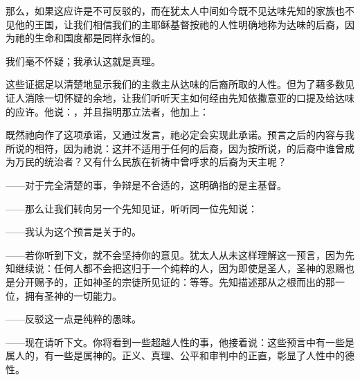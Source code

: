 那么，如果这应许是不可反驳的，而在犹太人中间如今既不见达味先知的家族也不见他的王国，让我们相信我们的主耶稣基督按祂的人性明确地称为达味的后裔，因为祂的生命和国度都是同样永恒的。\par

我们毫不怀疑；我承认这就是真理。\par

这些证据足以清楚地显示我们的主救主从达味的后裔所取的人性。但为了藉多数见证人消除一切怀疑的余地，让我们听听天主如何经由先知依撒意亚的口提及给达味的应许。他说：，并且指明那立法者，他加上：\par

既然祂向作了这项承诺，又通过发言，祂必定会实现此承诺。预言之后的内容与我所说的相符，因为祂说：这并不适用于任何的后裔，因为按所说，的后裔中谁曾成为万民的统治者？又有什么民族在祈祷中曾呼求的后裔为天主呢？\par

——对于完全清楚的事，争辩是不合适的，这明确指的是主基督。\par

——那么让我们转向另一个先知见证，听听同一位先知说：\par

——我认为这个预言是关于的。\par

——若你听到下文，就不会坚持你的意见。犹太人从未这样理解这一预言，因为先知继续说：任何人都不会把这归于一个纯粹的人，因为即使是圣人，圣神的恩赐也是分开赐予的，正如神圣的宗徒所见证的：等等。先知描述那从之根而出的那一位，拥有圣神的一切能力。\par

——反驳这一点是纯粹的愚昧。\par

——现在请听下文。你将看到一些超越人性的事，他接着说：这些预言中有一些是属人的，有一些是属神的。正义、真理、公平和审判中的正直，彰显了人性中的德性。\par

